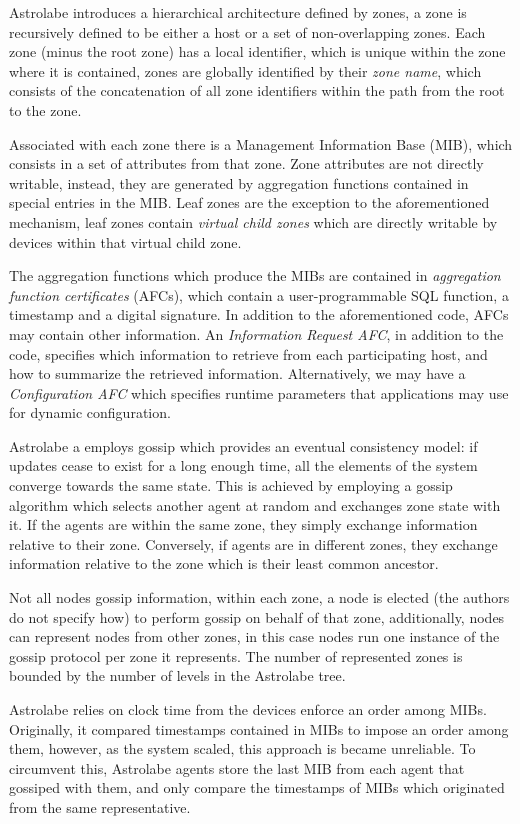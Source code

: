 Astrolabe introduces a hierarchical architecture defined by zones, a zone is recursively defined to be either a host or a set of non-overlapping zones. Each zone (minus the root zone) has a local identifier, which is unique within the zone where it is contained, zones are globally identified by their \textit{zone name}, which consists of the concatenation of all zone identifiers within the path from the root to the zone.

Associated with each zone there is a Management Information Base (MIB), which consists in a set of attributes from that zone. Zone attributes are not directly writable, instead, they are generated by aggregation functions contained in special entries in the MIB. Leaf zones are the exception to the aforementioned mechanism, leaf zones contain \textit{virtual child zones} which are directly writable by devices within that virtual child zone.

The aggregation functions which produce the MIBs are contained in \textit{aggregation function certificates} (AFCs), which contain a user-programmable SQL function, a timestamp and a digital signature. In addition to the aforementioned code, AFCs may contain other information. An \textit{Information Request AFC}, in addition to the code, specifies which information to retrieve from each participating host, and how to summarize the retrieved information. Alternatively, we may have a \textit{Configuration AFC} which specifies runtime parameters that applications may use for dynamic configuration.

Astrolabe a employs gossip which provides an eventual consistency model: if updates cease to exist for a long enough time, all the elements of the system  converge towards the same state. This is achieved by employing a gossip algorithm which selects another agent at random and exchanges zone state with it. If the agents are within the same zone, they simply exchange information relative to their zone. Conversely, if agents are in different zones, they exchange information relative to the zone which is their least common ancestor.

Not all nodes gossip information, within each zone, a node is elected (the authors do not specify how) to perform gossip on behalf of that zone, additionally, nodes can represent nodes from other zones, in this case nodes run one instance of the gossip protocol per zone it represents. The number of represented zones is bounded by the number of levels in the Astrolabe tree.

Astrolabe relies on clock time from the devices enforce an order among MIBs. Originally, it compared timestamps contained in MIBs to impose an order among them, however, as the system scaled, this approach is became unreliable. To circumvent this, Astrolabe agents store the last MIB from each agent that gossiped with them, and only compare the timestamps of MIBs which originated from the same representative.

